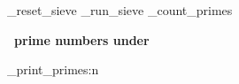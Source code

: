 \documentclass[a4paper]{article}
\begin{document}
\ExplSyntaxOn
\prime_reset_sieve
\prime_run_sieve
\prime_count_primes
\ExplSyntaxOff

{\Large\bf
    \ExplSyntaxOff\ 
        prime numbers under
    \ExplSyntaxOff
}\\[1cm]

\begin{multicols}{4}
\noindent
\ExplSyntaxOn
\prime_print_primes:n{\\}
\ExplSyntaxOff
\end{multicols}
\end{document}
